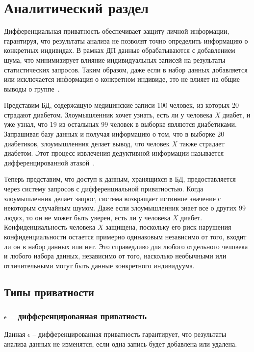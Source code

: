 \chapter{Аналитический раздел}

Дифференциальная приватность обеспечивает защиту личной информации, гарантируя, что результаты анализа не позволят точно определить информацию о конкретных индивидах. 
В рамках ДП данные обрабатываются с добавлением шума, что минимизирует влияние индивидуальных записей на результаты статистических запросов.
Таким образом, даже если в набор данных добавляется или исключается информация о конкретном индивиде, это не влияет на общие выводы о группе~\cite{Wood2018DifferentialPA}.

Представим БД, содержащую медицинские записи 100 человек, из которых 20 страдают диабетом.
Злоумышленник хочет узнать, есть ли у человека $X$ диабет, и уже узнал, что 19 из остальных 99 человек в выборке являются диабетиками.
Запрашивая базу данных и получая информацию о том, что в выборке 20 диабетиков, злоумышленник делает вывод, что человек
$X$ также страдает диабетом.
Этот процесс извлечения дедуктивной информации называется дифференцированной атакой~\cite{harvard}.

Теперь представим, что доступ к данным, хранящихся в БД, предоставляется через систему запросов с дифференциальной приватностью.
Когда злоумышленник делает запрос, система возвращает истинное значение с некоторым случайным шумом.
Даже если злоумышленник знает все о других 99 людях, то он не может быть уверен, есть ли у человека $X$ диабет.
Конфиденциальность человека $X$ защищена, поскольку его риск нарушения конфиденциальности остается примерно одинаковым независимо от того, входит ли он в набор данных или нет.
Это справедливо для любого отдельного человека и любого набора данных, независимо от того, насколько необычными или отличительными могут быть данные конкретного индивидуума.~\cite{harvard}
\newpage




\section{Типы приватности}

\subsection{$\epsilon$ -- дифференцированная приватность}
Данная $\epsilon$ -- дифференцированная приватность гарантирует, что результаты анализа данных не изменятся, если одна запись будет добавлена или удалена.~\cite{main}

